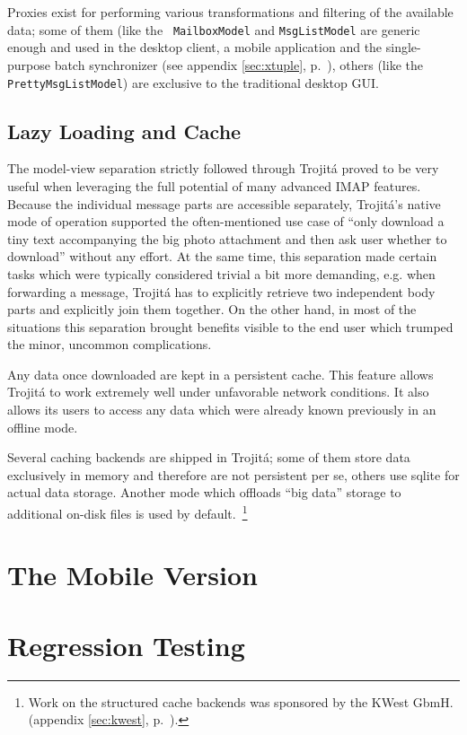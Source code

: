 \documentclass[trojita]{subfiles}
\begin{document}
Proxies exist for performing various transformations and filtering of the available data; some of them (like the {\tt
MailboxModel} and {\tt MsgListModel} are generic enough and used in the desktop client, a mobile application and the
single-purpose batch synchronizer (see appendix \ref{sec:xtuple}, p.~\pageref{sec:xtuple}), others (like the {\tt
PrettyMsgListModel}) are exclusive to the traditional desktop GUI.

\subsection{Lazy Loading and Cache}

The model-view separation strictly followed through Trojitá proved to be very useful when leveraging the full potential
of many advanced IMAP features.  Because the individual message parts are accessible separately, Trojitá's native mode
of operation supported the often-mentioned use case of ``only download a tiny text accompanying the big photo attachment
and then ask user whether to download'' without any effort.  At the same time, this separation made certain tasks which
were typically considered trivial a bit more demanding, e.g. when forwarding a message, Trojitá has to explicitly
retrieve two independent body parts and explicitly join them together.  On the other hand, in most of the situations
this separation brought benefits visible to the end user which trumped the minor, uncommon complications.

Any data once downloaded are kept in a persistent cache.  This feature allows Trojitá to work extremely well under
unfavorable network conditions.  It also allows its users to access any data which were already known previously in an
offline mode.

Several caching backends are shipped in Trojitá; some of them store data exclusively in memory and therefore are not
persistent per se, others use sqlite for actual data storage.  Another mode which offloads ``big data'' storage to
additional on-disk files is used by default.~\footnote{Work on the structured cache backends was sponsored by the KWest
GbmH. (appendix \ref{sec:kwest}, p.~\pageref{sec:kwest}).}

\section{The Mobile Version}

\section{Regression Testing}
\end{document}
